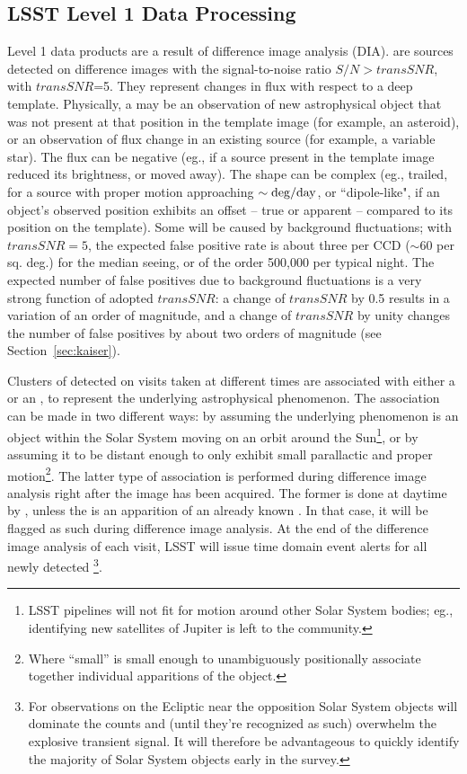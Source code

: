\subsection{LSST Level 1 Data Processing}

Level 1 data products are a result of difference image analysis (DIA).
\DIASources are sources detected on difference images with the signal-to-noise ratio $S/N>transSNR$,
with $transSNR$=5.
They represent changes in flux with respect to a deep template. Physically, a \DIASource may be an observation of new astrophysical object that was not present at that position in the template image (for example, an asteroid), or an observation of flux change in an existing source (for example, a variable star). The flux can be negative (eg., if a source present in the template image reduced its brightness, or moved away). The shape can be complex (eg., trailed, for a source with proper motion approaching $\sim {\rm deg}/{\rm day}$, or ``dipole-like", if an object's observed position exhibits an offset -- true or apparent -- compared to its position on the template).
Some \DIASources will be caused by background fluctuations; with $transSNR = 5$,
the expected false positive rate is about three per CCD ($\sim 60$ per sq. deg.) for the median seeing,
or of the order 500,000 per typical night.
The expected number of false positives due to background fluctuations is a very strong function
of adopted $transSNR$: a change of $transSNR$ by 0.5
results in a variation of an order of magnitude, and a change of $transSNR$ by unity changes the number of false
positives by about two orders of magnitude (see Section~\ref{sec:kaiser}).

Clusters of \DIASources detected on visits taken at different times are associated with either a \DIAObject or an \SSObject, to represent the underlying astrophysical phenomenon. The association can be made in two different ways: by assuming the underlying phenomenon is an object within the Solar System moving on an orbit around the Sun\footnote{LSST pipelines will not fit for motion around other Solar System bodies; eg., identifying new satellites of Jupiter is left to the community.}, or by assuming it to be distant enough to only exhibit small parallactic and proper motion\footnote{Where ``small'' is small enough to unambiguously positionally associate together individual apparitions of the object.}. The latter type of association is performed during difference image analysis right after the image has been acquired. The former is done at daytime by , unless the \DIASource is an apparition of an already known \SSObject. In that case, it will be flagged as such during difference image analysis. At the end of the difference image analysis of each visit, LSST will issue time domain event alerts for all
newly detected \DIASources\footnote{For observations on the Ecliptic near the opposition Solar System objects will dominate the \DIASource counts and (until they're recognized as such) overwhelm the explosive transient signal. It will therefore be advantageous to quickly identify the majority of Solar System objects early in the survey.}.

